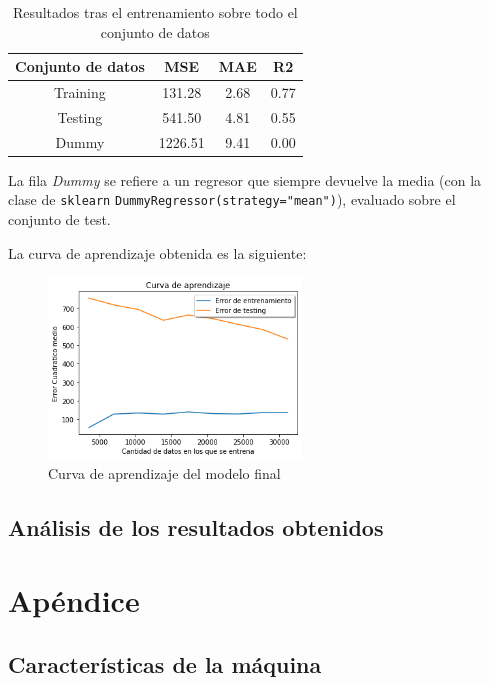 \documentclass[11pt]{article}
\begin{document}
\begin{table}[H]
    \centering
    \begin{tabular}{|c|c|c|c|}
    \hline
    Conjunto de datos  & MSE & MAE & R2 \\
    \hline
    Training & 131.28  & 2.68 & 0.77 \\
    Testing  & 541.50  & 4.81 & 0.55 \\
    Dummy    & 1226.51 & 9.41 & 0.00 \\
    \hline
    \end{tabular}
    \caption{Resultados tras el entrenamiento sobre todo el conjunto de datos}
\end{table}

La fila \emph{Dummy} se refiere a un regresor que siempre devuelve la media (con la clase de \lstinline{sklearn} \lstinline{DummyRegressor(strategy="mean")}), evaluado sobre el conjunto de test.

La curva de aprendizaje obtenida es la siguiente:

\begin{figure}[H]
  \centering
  \includegraphics[width=0.6\textwidth]{curva_aprendizaje}
  \caption{Curva de aprendizaje del modelo final}
\end{figure}

\subsection{Análisis de los resultados obtenidos}



\pagebreak
\section{Apéndice} \label{apendice}

\subsection{Características de la máquina}
\end{document}

